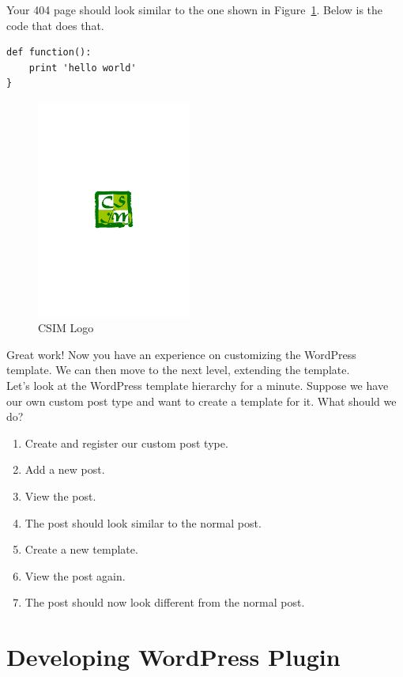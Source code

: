 \documentclass{article}
\begin{document}
\noindent Your 404 page should look similar to the one shown in
Figure~\ref{fig:csim-logo2}. Below is the code that does that.

\begin{verbatim}
def function():
    print 'hello world'
}
\end{verbatim}

\begin{figure}[t]
    \centering
    \includegraphics[width=2in]{figures/csim}
    \caption{CSIM Logo}
    \label{fig:csim-logo2}
\end{figure}

\noindent Great work! Now you have an experience on customizing the WordPress
template. We can then move to the next level, extending the template. \\

\noindent Let's look at the WordPress template hierarchy for a minute. Suppose
we have our own custom post type and want to create a template for it. What
should we do?

\begin{enumerate}
    \item Create and register our custom post type.
    \item Add a new post.
    \item View the post.
    \item The post should look similar to the normal post.
    \item Create a new template.
    \item View the post again.
    \item The post should now look different from the normal post.
\end{enumerate}


\section*{Developing WordPress Plugin}
\end{document}
